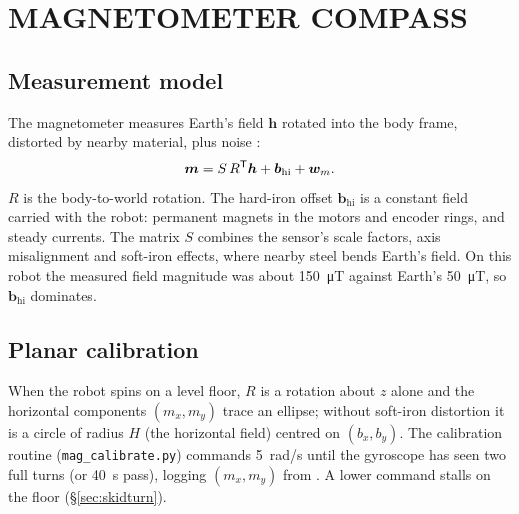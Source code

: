 \section{MAGNETOMETER COMPASS}
\label{sec:mag}

\subsection{Measurement model}

The magnetometer measures Earth's field $\bm h$ rotated into the body frame,
distorted by nearby material, plus noise \cite{gebreegziabher2006mag}:
\begin{equation}\label{eq:magmodel}
\bm m = S\,R^{\mathsf T}\bm h + \bm b_{\mathrm{hi}} + \bm w_m .
\end{equation}
$R$ is the body-to-world rotation. The hard-iron offset $\bm b_{\mathrm{hi}}$
is a constant field carried with the robot: permanent magnets in the motors
and encoder rings, and steady currents. The matrix $S$ combines the sensor's
scale factors, axis misalignment and soft-iron effects, where nearby steel
bends Earth's field. On this robot the measured field magnitude was about
\SI{150}{\micro T} against Earth's \SI{50}{\micro T}, so
$\bm b_{\mathrm{hi}}$ dominates.

\subsection{Planar calibration}

When the robot spins on a level floor, $R$ is a rotation about $z$ alone and
the horizontal components $(m_x,m_y)$ trace an ellipse; without soft-iron
distortion it is a circle of radius $H$ (the horizontal field) centred on
$(b_x,b_y)$. The calibration routine (\texttt{mag\_calibrate.py}) commands
\SI{5}{rad/s} until the gyroscope has seen two full turns (or \SI{40}{s} pass),
logging $(m_x,m_y)$ from . A lower command stalls on the floor
(\S\ref{sec:skidturn}).

